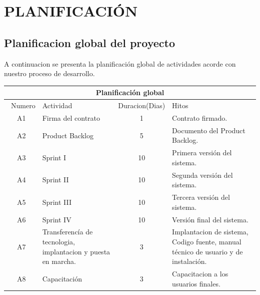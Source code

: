 \documentclass[11pt,letterpaper]{report}
\begin{document}
\chapter{PLANIFICACIÓN}
\section{Planificacion global del proyecto}
A continuacion se presenta la planificación global de actividades acorde con nuestro proceso de desarrollo.
\begin{center}
\begin{tabular}{|c|p{4.5cm}|c|p{6cm}|}
	\hline
	\multicolumn{4}{|c|}{Planificación global} \\
	\hline
	\ Numero & Actividad & Duracion(Dias) & Hitos \\ \hline
	A1 & Firma del contrato & 1 & Contrato firmado. \\ \hline
	A2 & Product Backlog & 5 & Documento del Product Backlog. \\ \hline
	A3 & Sprint I & 10 & Primera versión del sistema. \\ \hline
	A4 & Sprint II & 10 & Segunda versión del sistema. \\ \hline
	A5 & Sprint III & 10 & Tercera versión del sistema. \\ \hline
	A6 & Sprint IV & 10 & Versión final del sistema. \\ \hline
	A7 & Transferencía de tecnologia, implantacion y puesta en marcha. & 3 & Implantacion de sistema, Codigo fuente, manual técnico  de usuario y de instalación. \\  \hline
	A8 & Capacitación & 3 &  Capacitacion a los usuarios finales.\\ \hline
\end{tabular}
\end{center}
\end{document}
